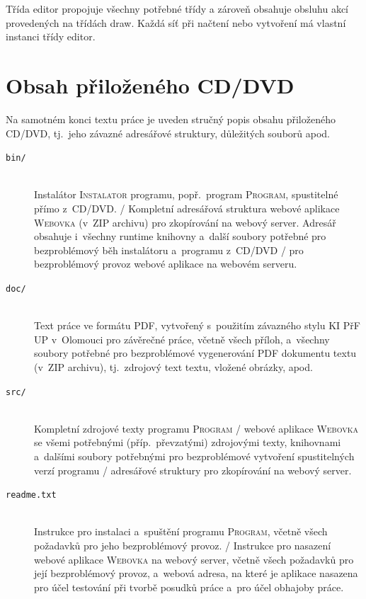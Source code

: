 \documentclass[
  biblatex,
  glossaries,
  index
]{kidiplom}
\begin{document}
Třída editor propojuje všechny potřebné třídy a zároveň obsahuje obsluhu 
akcí provedených na třídách draw. Každá síť při načtení nebo vytvoření 
má vlastní instanci třídy editor.



\clearpage
\section{Obsah přiloženého CD/DVD} \label{sec:ObsahCD}

Na samotném konci textu práce je uveden stručný popis obsahu
přiloženého CD/DVD, tj.~jeho závazné adresářové struktury, důležitých
souborů apod.

\begin{description}

  \item[\texttt{bin/}] \hfill \\
        Instalátor \textsc{Instalator} programu, popř.~program
        \textsc{Program}, spustitelné přímo z~CD/DVD. / Kompletní adresářová
        struktura webové aplikace \textsc{Webovka} (v~ZIP archivu) pro
        zkopírování na webový server. Adresář obsahuje i~všechny runtime
        knihovny a~další soubory potřebné pro bezproblémový běh instalátoru
        a~programu z~CD/DVD / pro bezproblémový provoz webové aplikace na
        webovém serveru.

  \item[\texttt{doc/}] \hfill \\
        Text práce ve formátu PDF, vytvořený s~použitím závazného stylu KI
        PřF UP v~Olomouci pro závěrečné práce, včetně všech příloh,
        a~všechny soubory potřebné pro bezproblémové vygenerování PDF
        dokumentu textu (v~ZIP archivu), tj.~zdrojový text textu, vložené
        obrázky, apod.

  \item[\texttt{src/}] \hfill \\
        Kompletní zdrojové texty programu \textsc{Program} / webové aplikace
        \textsc{Webovka} se všemi potřebnými (příp.~převzatými) zdrojovými
        texty, knihovnami a~dalšími soubory potřebnými pro bezproblémové
        vytvoření spustitelných verzí programu / adresářové struktury pro
        zkopírování na webový server.

  \item[\texttt{readme.txt}] \hfill \\
        Instrukce pro instalaci a~spuštění programu \textsc{Program}, včetně
        všech požadavků pro jeho bezproblémový provoz. / Instrukce pro
        nasazení webové aplikace \textsc{Webovka} na webový server, včetně
        všech požadavků pro její bezproblémový provoz, a~webová adresa, na
        které je aplikace nasazena pro účel testování při tvorbě posudků
        práce a~pro účel obhajoby práce.

\end{description}
\end{document}
